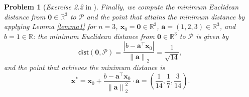 \documentclass[11pt]{article}
\newtheorem{problem}{Problem}
\begin{document}
\begin{problem} [\emph{Exercise 2.2} in \cite{calafiore2014optimization}]
{\indent Finally, we compute the minimum Euclidean distance from $\mathbf{0} \in \mathbb{R}^3$ to $\mathcal{P}$ and the point that attains the minimum distance by applying Lemma \ref{lemma1} for $n=3$, $\mathbf{x}_0 = \mathbf{0} \in \mathbb{R}^3$, $\mathbf{a} = \left( 1, 2, 3 \right) \in \mathbb{R}^3$, and $b = 1 \in \mathbb{R}$: the minimum Euclidean distance from $\mathbf{0} \in \mathbb{R}^3$ to $\mathcal{P}$ is given by
\begin{equation*}
\textsf{dist} \left( \mathbf{0}, \mathcal{P} \right) = \frac{\left| b - \mathbf{a}^{\top} \mathbf{x}_0 \right|}{\left\| \mathbf{a} \right\|_2} = \frac{1}{\sqrt{14}},
\end{equation*}
and the point that achieves the minimum distance is
\begin{equation*}
    \mathbf{x}^* = \mathbf{x}_0 + \frac{b - \mathbf{a}^{\top} \mathbf{x}_0}{\left\| \mathbf{a} \right\|_{2}^2} \cdot \mathbf{a} = \left( \frac{1}{14}, \frac{1}{7}, \frac{3}{14} \right).
\end{equation*}

}
\end{problem}
\end{document}
